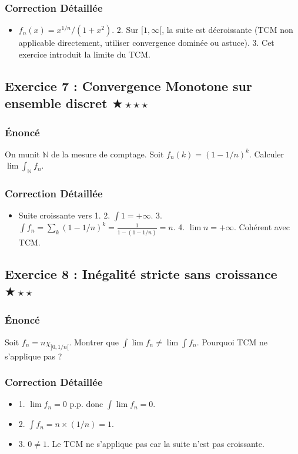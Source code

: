 \documentclass[11pt,a4paper]{article}
\begin{document}
\subsubsection*{Correction Détaillée}
\begin{itemize}
\item $f_n(x) = x^{1/n} / (1+x^2)$. 2. Sur $[1, \infty[$, la suite est décroissante (TCM non applicable directement, utiliser convergence dominée ou astuce). 3. Cet exercice introduit la limite du TCM.
\end{itemize}

\subsection*{Exercice 7 : Convergence Monotone sur ensemble discret \quad $\bigstar\star\star\star$}

\subsubsection*{Énoncé}
On munit $\mathbb{N}$ de la mesure de comptage. Soit $f_n(k) = (1 - 1/n)^k$. Calculer $\lim \int_{\mathbb{N}} f_n$.

\subsubsection*{Correction Détaillée}
\begin{itemize}
\item Suite croissante vers 1. 2. $\int 1 = +\infty$. 3. $\int f_n = \sum_k (1-1/n)^k = \frac{1}{1-(1-1/n)} = n$. 4. $\lim n = +\infty$. Cohérent avec TCM.
\end{itemize}

\subsection*{Exercice 8 : Inégalité stricte sans croissance \quad $\bigstar\star\star$}

\subsubsection*{Énoncé}
Soit $f_n = n \chi_{]0, 1/n[}$. Montrer que $\int \lim f_n \neq \lim \int f_n$. Pourquoi TCM ne s'applique pas ?

\subsubsection*{Correction Détaillée}
\begin{itemize}
\item 1. $\lim f_n = 0$ p.p. donc $\int \lim f_n = 0$.
\item 2. $\int f_n = n \times (1/n) = 1$.
\item 3. $0 \neq 1$. Le TCM ne s'applique pas car la suite n'est pas croissante.
\end{itemize}
\end{document}
